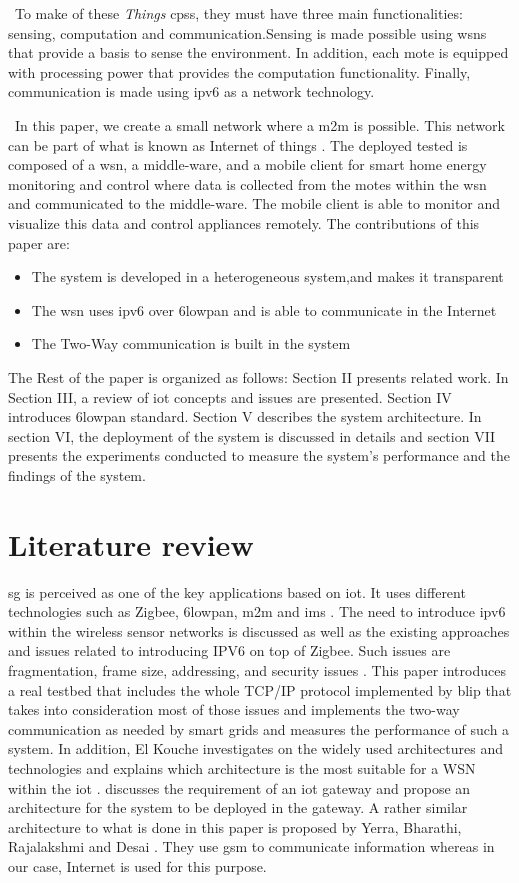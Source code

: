 \documentclass[conference]{IEEEtran}
\begin{document}
\
To make of these \textit{Things} \glspl{cps}, they must have three main functionalities: sensing, computation and communication.Sensing is made possible using \glspl{wsn} that provide a basis to sense the environment. In addition, each mote is equipped with processing power that provides the computation functionality. Finally, communication is made using \gls{ipv6} as a network technology.

\
In this paper, we create a small network where a \gls{m2m} is possible. This network can be part of what is known as Internet of things \cite{ref1}. The deployed tested  is composed of a \gls{wsn}, a middle-ware, and a mobile client for smart home energy monitoring and control where data is collected from the motes within the \gls{wsn} and communicated to the middle-ware. The mobile client is able to monitor and visualize this data and control appliances remotely. The contributions of this paper are:
\begin{itemize}
\item The system is developed in a heterogeneous system,and makes it transparent
\item The \gls{wsn} uses \gls{ipv6} over \gls{6lowpan} and is able to communicate in the Internet
\item The Two-Way communication is built in the system 
\end{itemize}
The Rest of the paper is organized as follows: Section II presents related work. In Section III, a review of \gls{iot} concepts and issues are presented. Section IV introduces \gls{6lowpan} standard. Section V describes the system architecture. In section VI, the deployment of the system is discussed in details and section VII presents the experiments conducted to measure the system's performance and the findings of the system.
 
\section{Literature review}
\gls{sg} is perceived as one of the key applications based on \gls{iot}. It uses different technologies such as Zigbee, \gls{6lowpan}, \gls{m2m} and \gls{ims} \cite{ref1}.  The need to introduce \gls{ipv6} within the wireless sensor networks is discussed as well as the existing approaches and issues related to introducing IPV6 on top of Zigbee. Such issues are fragmentation, frame size, addressing, and security issues \cite{ref2}. This paper introduces a real testbed that includes the whole TCP/IP protocol implemented by \gls{blip} that takes into consideration most of those issues and implements the two-way communication as needed by smart grids and measures the performance of such a system. In addition, El Kouche investigates on the widely used architectures and technologies and explains which architecture is the most suitable for a WSN within the \gls{iot} \cite{ref3}. \cite{ref4} discusses the requirement of an \gls{iot} gateway and propose an architecture for the system to be deployed in the gateway. A rather similar architecture to what is done in this paper is proposed by Yerra, Bharathi, Rajalakshmi and Desai \cite{ref7}. They use \gls{gsm} to communicate information whereas in our case, Internet is used for this purpose. 
\end{document}
